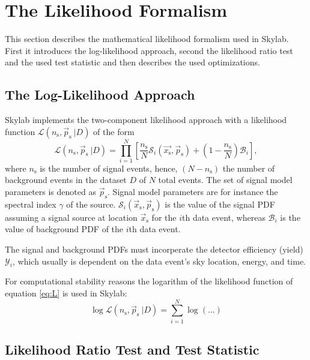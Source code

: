 \documentclass{article}
\newcommand{\ns}{n_{\mathrm{s}}}
\newcommand{\ps}{\vec{p}_{\mathrm{s}}}
\begin{document}
\section{The Likelihood Formalism}

This section describes the mathematical likelihood formalism used in Skylab.
First it introduces the log-likelihood approach, second the likelihood ratio
test and the used test statistic and then describes the used optimizations.

\subsection{The Log-Likelihood Approach}

Skylab implements the two-component likelihood approach with a likelihood
function $\mathcal{L}(n_{\mathrm{s}},\vec{p}_{\mathrm{s}}~|D)$ of the form
\begin{equation}
 \mathcal{L}(\ns,\ps~|D) = \prod_{i=1}^{N}\left[ \frac{\ns}{N} \mathcal{S}_{i}(\vec{x_{\mathrm{s}}},\ps) + (1 - \frac{\ns}{N}) \mathcal{B}_{i} \right],
\label{eq:L}
\end{equation}
where $\ns$ is the number of signal events, hence, $(N-\ns)$ the number of
background events in the dataset $D$ of $N$ total events.
The set of signal model parameters is denoted as $\ps$. Signal model parameters
are for instance the spectral index $\gamma$ of the source.
$\mathcal{S}_i(\vec{x}_{\mathrm{s}},\ps)$ is the value of the signal PDF
assuming a signal source at location $\vec{x}_{\mathrm{s}}$ for the $i$th data
event, whereas $\mathcal{B}_i$ is the value of background PDF of the $i$th data
event.

The signal and background PDFs must incorperate the detector efficiency (yield)
$\mathcal{Y}_i$, which usually is dependent on the data event's sky location,
energy, and time.

For computational stability reasons the logarithm of the likelihood function of
equation \ref{eq:L} is used in Skylab:
\begin{equation}
 \log \mathcal{L}(\ns,\ps~|D) = \sum_{i=1}^{N} \log (...)
\end{equation}

\subsection{Likelihood Ratio Test and Test Statistic}
\end{document}
